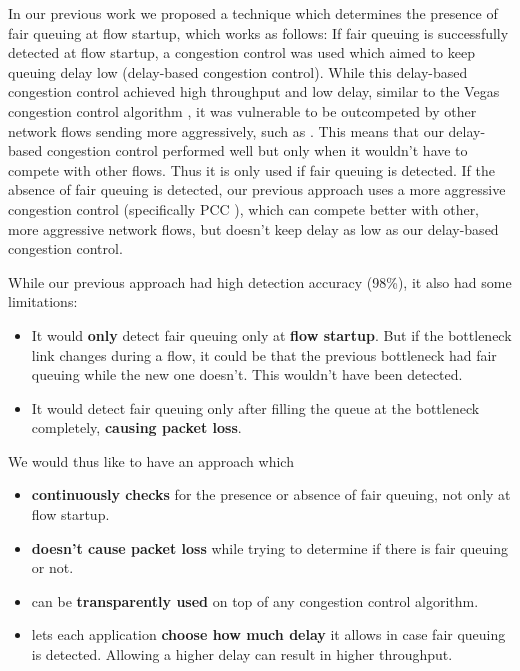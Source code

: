 \documentclass[conference]{IEEEtran}
\begin{document}
In our previous work we proposed a technique which determines the presence of fair queuing at flow startup, which works as follows: 
If fair queuing is successfully detected at flow startup, a congestion control was used which aimed to keep queuing delay low (delay-based congestion control). 
While this delay-based congestion control achieved high throughput and low delay, similar to the Vegas congestion control algorithm \cite{brakmo_tcp_1995}, 
it was vulnerable to be outcompeted by other network flows sending more aggressively, such as \cite{cardwell_bbr_2016,dong_pcc_2015,ha_cubic_2008}.
This means that our delay-based congestion control performed well but only when it wouldn't have to compete with other flows. Thus it is only used if fair queuing is detected. 
If the absence of fair queuing is detected, our previous approach uses a more aggressive congestion control (specifically PCC \cite{dong_pcc_2015}), which can compete better with other, more aggressive network flows,
but doesn't keep delay as low as our delay-based congestion control. 

While our previous approach had high detection accuracy (98\%), it also had some limitations:
\begin{itemize}
    \item It would \textbf{only} detect fair queuing only at \textbf{flow startup}. 
    But if the bottleneck link changes during a flow, it could be that the previous bottleneck had fair queuing while the new one doesn't. This wouldn't have been detected. 
    \item It would detect fair queuing only after filling the queue at the bottleneck completely, \textbf{causing packet loss}. 
\end{itemize}

We would thus like to have an approach which 
\begin{itemize}
    \item \textbf{continuously checks} for the presence or absence of fair queuing, not only at flow startup. 
    \item \textbf{doesn't cause packet loss} while trying to determine if there is fair queuing or not. 
    \item can be \textbf{transparently used} on top of any congestion control algorithm. 
    \item lets each application \textbf{choose how much delay} it allows in case fair queuing is detected. Allowing a higher delay can result in higher throughput. 
\end{itemize} 
\end{document}
